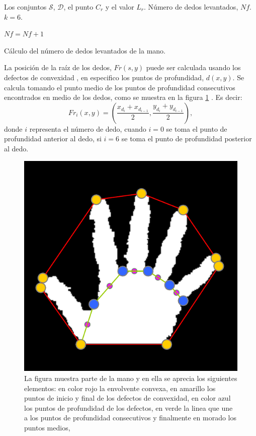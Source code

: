 \begin{algorithm}[h!]
\begin{algorithmic}[1]
\REQUIRE Los conjuntos $\mathcal{S}$, $\mathcal{D}$, el punto $C_r$ y el valor $L_r$.   
\ENSURE Número de dedos levantados, $Nf$.  
	\STATE $k=6$. 	
	
	\STATE $Nf=Nf+1$
	\ENDIF 
\ENDFOR 

\caption{Cálculo del número de dedos levantados de la mano.}
\label{alg:NumDedos} 
\end{algorithmic}
\end{algorithm} 

La posición de la raíz de los dedos, $Fr(s,y)$ puede ser calculada usando los defectos de convexidad \citep{Hummel2014}, en especifico los puntos de profundidad, $d(x,y)$. Se calcula tomando el punto medio de los puntos de profundidad consecutivos encontrados en medio de los dedos, como se muestra en la figura \ref{fig:RootFingers} . Es decir: 
$$ Fr_i(x,y)= \left( \frac{ x_{d_i}+x_{d_{i-1}} }{2},\frac{y_{d_i}+y_{d_{i-1}}}{2}  \right), $$ 
donde $i$ representa el número de dedo, cuando $i=0$ se toma el punto de profundidad anterior al dedo, si $i=6$ se toma el punto de profundidad posterior al dedo. 

\begin{figure}[h!]
\begin{center}
\includegraphics[scale=.55]{./Figures/rootFingers.png}
\end{center}
\caption{La figura muestra parte de la mano y en ella se aprecia los siguientes elementos: en color rojo la envolvente convexa, en amarillo los puntos de inicio y final de los defectos de convexidad,  en color azul los puntos de profundidad de los defectos, en verde la linea que une a los puntos de profundidad consecutivos y finalmente en morado los puntos medios, \citep{Hummel2014}} 
\label{fig:RootFingers}
\end{figure} 

